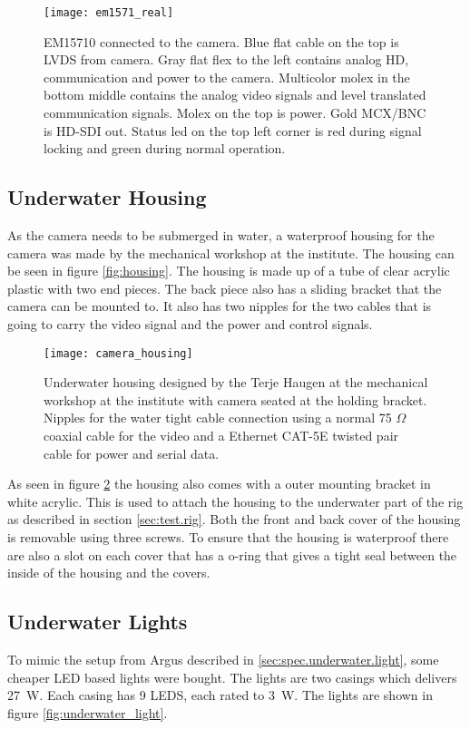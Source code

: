 \begin{figure}
 	\centering
 	\texttt{[image: em1571\_real]}
 	\caption{EM15710 connected to the camera. Blue flat cable on the top is LVDS from camera. Gray flat flex to the left contains 
 		analog HD, communication and power to the camera. Multicolor molex in the bottom middle contains the analog video signals and level translated communication signals. Molex on the top is power. Gold MCX/BNC is HD-SDI out. Status led on the top left corner is red during signal locking and green during normal operation.}
 	\label{fig:hd-sdi.card}
\end{figure}

\subsection{Underwater Housing}
As the camera needs to be submerged in water, a waterproof housing for the camera was made by the mechanical workshop at the institute. The housing can 
be seen in figure \vref{fig:housing}. The housing is made up of a tube of clear acrylic plastic with two end pieces. The back piece also
has a sliding bracket that the camera can be mounted to. It also has two nipples for the two cables that is going to carry the video signal and 
the power and control signals. 

\begin{figure}
 	\centering
 	\texttt{[image: camera\_housing]}
 	\caption{Underwater housing designed by the Terje Haugen at the mechanical workshop at the institute with camera seated at the holding bracket. Nipples for the 
 		water tight cable connection using a normal 75 $\Omega$ coaxial cable for the video and a Ethernet CAT-5E twisted pair cable for power and serial data.}
 	\label{fig:housing}
\end{figure}
As seen in figure \ref{fig:housing} the housing also comes with a outer mounting bracket in white acrylic. This is used to attach the housing to the underwater 
part of the rig as described in section \vref{sec:test.rig}. Both the front and back cover of the housing is removable using three screws. To ensure that 
the housing is waterproof there are also a slot on each cover that has a o-ring that gives a tight seal between the inside of the housing and the covers.

\subsection{Underwater Lights}
To mimic the setup from Argus described in \vref{sec:spec.underwater.light}, some cheaper LED based lights were bought. The lights are two casings 
which delivers \SI{27}{\watt}. Each casing has 9 LEDS, each rated to \SI{3}{\watt}. The lights are shown in figure \vref{fig:underwater_light}.

